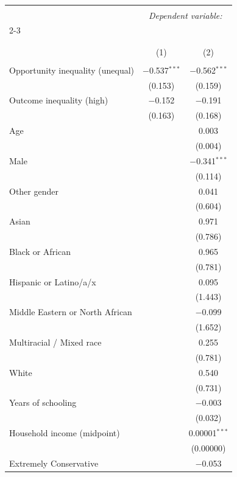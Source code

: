 
\begin{table}[H] \centering 
  \caption{} 
  \label{} 
\tiny 
\begin{tabular}{@{\extracolsep{5pt}}lcc} 
\\[-1.8ex]\hline 
\hline \\[-1.8ex] 
 & \multicolumn{2}{c}{\textit{Dependent variable:}} \\ 
\cline{2-3} 
\\[-1.8ex] & \multicolumn{2}{c}{} \\ 
\\[-1.8ex] & (1) & (2)\\ 
\hline \\[-1.8ex] 
 Opportunity inequality (unequal) & $-$0.537$^{***}$ & $-$0.562$^{***}$ \\ 
  & (0.153) & (0.159) \\ 
  Outcome inequality (high) & $-$0.152 & $-$0.191 \\ 
  & (0.163) & (0.168) \\ 
  Age &  & 0.003 \\ 
  &  & (0.004) \\ 
  Male &  & $-$0.341$^{***}$ \\ 
  &  & (0.114) \\ 
  Other gender &  & 0.041 \\ 
  &  & (0.604) \\ 
  Asian &  & 0.971 \\ 
  &  & (0.786) \\ 
  Black or African &  & 0.965 \\ 
  &  & (0.781) \\ 
  Hispanic or Latino/a/x &  & 0.095 \\ 
  &  & (1.443) \\ 
  Middle Eastern or North African &  & $-$0.099 \\ 
  &  & (1.652) \\ 
  Multiracial / Mixed race &  & 0.255 \\ 
  &  & (0.781) \\ 
  White &  & 0.540 \\ 
  &  & (0.731) \\ 
  Years of schooling &  & $-$0.003 \\ 
  &  & (0.032) \\ 
  Household income (midpoint) &  & 0.00001$^{***}$ \\ 
  &  & (0.00000) \\ 
  Extremely Conservative &  & $-$0.053 \\ 

\end{tabular}
\end{table}
